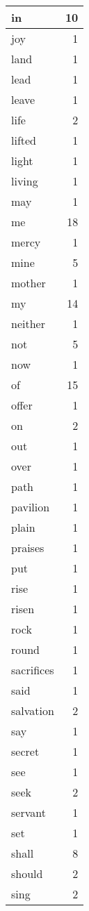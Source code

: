 \begin{center}
\begin{longtable}{l|r}
in & 10 \\ \hline
joy & 1 \\ \hline
land & 1 \\ \hline
lead & 1 \\ \hline
leave & 1 \\ \hline
life & 2 \\ \hline
lifted & 1 \\ \hline
light & 1 \\ \hline
living & 1 \\ \hline
may & 1 \\ \hline
me & 18 \\ \hline
mercy & 1 \\ \hline
mine & 5 \\ \hline
mother & 1 \\ \hline
my & 14 \\ \hline
neither & 1 \\ \hline
not & 5 \\ \hline
now & 1 \\ \hline
of & 15 \\ \hline
offer & 1 \\ \hline
on & 2 \\ \hline
out & 1 \\ \hline
over & 1 \\ \hline
path & 1 \\ \hline
pavilion & 1 \\ \hline
plain & 1 \\ \hline
praises & 1 \\ \hline
put & 1 \\ \hline
rise & 1 \\ \hline
risen & 1 \\ \hline
rock & 1 \\ \hline
round & 1 \\ \hline
sacrifices & 1 \\ \hline
said & 1 \\ \hline
salvation & 2 \\ \hline
say & 1 \\ \hline
secret & 1 \\ \hline
see & 1 \\ \hline
seek & 2 \\ \hline
servant & 1 \\ \hline
set & 1 \\ \hline
shall & 8 \\ \hline
should & 2 \\ \hline
sing & 2 \\ \hline

\end{longtable}
\end{center}
